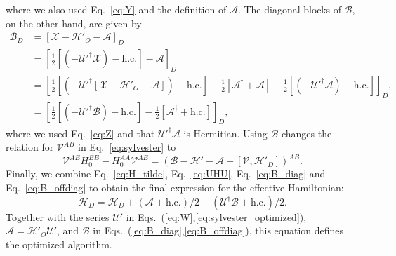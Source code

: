 %
where we also used Eq.~\eqref{eq:Y} and the definition of $\mathcal{A}$.
The diagonal blocks of $\mathcal{B}$, on the other hand, are given by
%
\begin{equation}
\label{eq:B_diag}
\begin{aligned}
  \mathcal{B}_D &= \left[\mathcal{X} - \mathcal{H}'_{O} - \mathcal{A}\right]_D \\
  &= \left[\frac{1}{2}[(-\mathcal{U}'^\dagger \mathcal{X})- \textrm{h.c.}] - \mathcal{A}\right]_D \\
  &= \left[\frac{1}{2}[(-\mathcal{U}'^\dagger [\mathcal{X} - \mathcal{H}'_{O} - \mathcal{A}])- \textrm{h.c.}] - \frac{1}{2}[\mathcal{A}^\dagger + \mathcal{A} ] + {\frac{1}{2}[( - \mathcal{U}'^\dagger\mathcal{A} ) - \textrm{h.c.}]}\right]_D, \\
  &= \left[\frac{1}{2}[(-\mathcal{U}'^\dagger \mathcal{B})- \textrm{h.c.}] - \frac{1}{2}[\mathcal{A}^\dagger + \textrm{h.c.} ]\right]_D,
\end{aligned}
\end{equation}
%
where we used Eq.~\eqref{eq:Z} and that $\mathcal{U}'^\dagger \mathcal{A}$ is Hermitian.
%
Using $\mathcal{B}$ changes the relation for $\mathcal{V}^{AB}$ in Eq.~\eqref{eq:sylvester} to
\begin{equation}
\label{eq:sylvester_optimized}
\mathcal{V}^{AB}H_0^{BB} - H_0^{AA}\mathcal{V}^{AB} = \left(\mathcal{B} - \mathcal{H}' - \mathcal{A} - [\mathcal{V}, \mathcal{H}'_{D}]\right)^{AB}.
\end{equation}
Finally, we combine Eq.~\eqref{eq:H_tilde}, Eq.~\eqref{eq:UHU}, Eq.~\eqref{eq:B_diag} and Eq.~\eqref{eq:B_offdiag} to obtain the final expression for the effective Hamiltonian:
%
\begin{equation}
\label{eq:H_tilde_optimized}
\tilde{\mathcal{H}}_D = \mathcal{H}_D + (\mathcal{A} + \textrm{h.c.})/2 -(\mathcal{U}^\dagger \mathcal{B} + \textrm{h.c.})/2.
\end{equation}
Together with the series $\mathcal{U}'$ in Eqs.~(\ref{eq:W},\ref{eq:sylvester_optimized}), $\mathcal{A} = \mathcal{H}'_{O}\mathcal{U}'$, and $\mathcal{B}$ in Eqs.~(\ref{eq:B_diag},\ref{eq:B_offdiag}), this equation defines the optimized algorithm.
